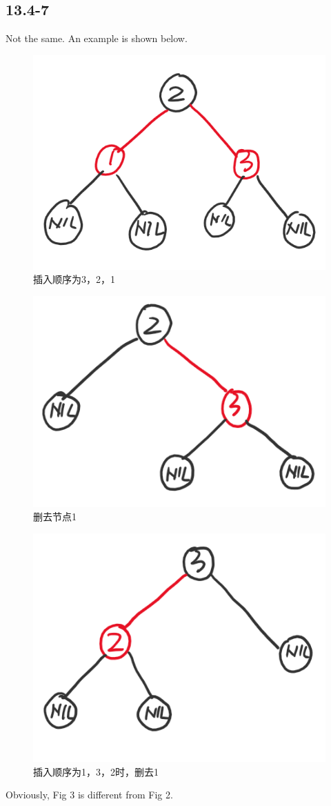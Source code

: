 \documentclass[twocolumn]{article}
\begin{document}
	\subsection*{13.4-7}
	Not the same. An example is shown below.
	\begin{figure}[H]
		\centering
		\includegraphics[width=0.7\linewidth]{13-1}
		\caption{插入顺序为3，2，1}
	\end{figure}
		\begin{figure}[H]
			\centering
			\includegraphics[width=0.7\linewidth]{13-2}
			\caption{删去节点1}
		\end{figure}
	\begin{figure}[H]
		\centering
		\includegraphics[width=0.7\linewidth]{13-3}
		\caption{插入顺序为1，3，2时，删去1}
	\end{figure}
	Obviously, Fig 3 is different from Fig 2.
\end{document}

